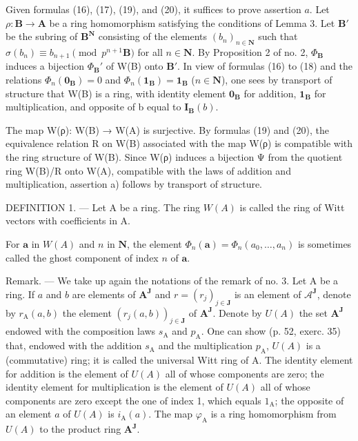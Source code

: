 Given formulas (16), (17), (19), and (20), it suffices to prove assertion \(a\). Let \(\rho: \mathbf{B} \to \mathbf{A}\) be a ring homomorphism satisfying the conditions of Lemma 3. Let \(\mathbf{B}'\) be the subring of \(\mathbf{B}^{\mathbf{N}}\) consisting of the elements \((b_n)_{n \in \mathbf{N}}\) such that \(\sigma(b_n) \equiv b_{n+1} \pmod{p^{n+1}\mathbf{B}}\) for all \(n \in \mathbf{N}\). By Proposition 2 of no. 2, \(\Phi_{\mathbf{B}}\) induces a bijection \(\Phi_{\mathbf{B}}'\) of W(B) onto \(\mathbf{B}'\). In view of formulas (16) to (18) and the relations \(\Phi_n(\mathbf{0}_{\mathbf{B}}) = 0\) and \(\Phi_n(\mathbf{1}_{\mathbf{B}}) = \mathbf{1}_{\mathbf{B}}\) (\(n \in \mathbf{N}\)), one sees by transport of structure that W(B) is a ring, with identity element \(\mathbf{0}_{\mathbf{B}}\) for addition, \(\mathbf{1}_{\mathbf{B}}\) for multiplication, and opposite of b equal to \(\mathbf{I}_{\mathbf{B}}(b)\).

The map W(ρ): W(B) → W(A) is surjective. By formulas (19) and (20), the equivalence relation R on W(B) associated with the map W(ρ) is compatible with the ring structure of W(B). Since W(ρ) induces a bijection Ψ from the quotient ring W(B)/R onto W(A), compatible with the laws of addition and multiplication, assertion a) follows by transport of structure.

DEFINITION 1. --- Let A be a ring. The ring \(W(A)\) is called the ring of Witt vectors with coefficients in A.

For \(\boldsymbol{a}\) in \(W(A)\) and \(n\) in \(\mathbf{N}\), the element \(\Phi_n(\boldsymbol{a}) = \Phi_n(a_0, \ldots, a_n)\) is sometimes called the ghost component of index \(n\) of \(\boldsymbol{a}\).

Remark. --- We take up again the notations of the remark of no. 3. Let A be a ring. If \(a\) and \(b\) are elements of \(\mathbf{A}^{\mathbf{J}}\) and \(r = (r_{j})_{j\in\mathbf{J}}\) is an element of \(\mathcal{A}^{\mathbf{J}}\), denote by \(r_{\mathrm{A}}(a,b)\) the element \((r_{j}(a,b))_{j\in\mathbf{J}}\) of \(\mathbf{A}^{\mathbf{J}}\). Denote by \(U(A)\) the set \(\mathbf{A}^{\mathbf{J}}\) endowed with the composition laws \(s_{\mathrm{A}}\) and \(p_{\mathrm{A}}\). One can show (p. 52, exerc. 35) that, endowed with the addition \(s_{\mathrm{A}}\) and the multiplication \(p_{\mathrm{A}}\), \(U(A)\) is a (commutative) ring; it is called the universal Witt ring of A. The identity element for addition is the element of \(U(A)\) all of whose components are zero; the identity element for multiplication is the element of \(U(A)\) all of whose components are zero except the one of index 1, which equals \(1_{\mathrm{A}}\); the opposite of an element \(a\) of \(U(A)\) is \(i_{\mathrm{A}}(a)\). The map \(\varphi_{\mathrm{A}}\) is a ring homomorphism from \(U(A)\) to the product ring \(\mathbf{A}^{\mathbf{J}}\).

